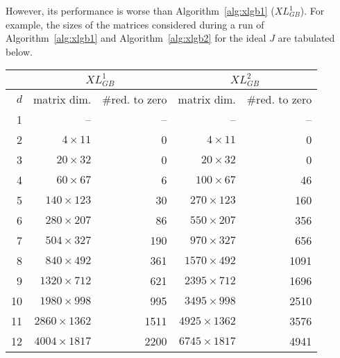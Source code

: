 \begin{algorithm}

\caption{$XL_{GB}^2$\label{alg:xlgb2}} 
\end{algorithm}

However, its performance is worse than Algorithm~\ref{alg:xlgb1} ($XL_{GB}^1$). For example, the sizes of the matrices considered during a run of Algorithm~\ref{alg:xlgb1} and Algorithm~\ref{alg:xlgb2} for the ideal $J$ are tabulated below.

\begin{center}
\begin{tabular}{|r|r|r|r|r|}
\hline
    & \multicolumn{2}{|c|}{$XL_{GB}^1$} & \multicolumn{2}{|c|}{$XL_{GB}^2$}\\
\hline
$d$ & matrix dim. & \#red. to zero & matrix dim. & \#red. to
zero\\
\hline
 1 &                 --&    --&                -- &    --\\
 2 & $   4 \times   11$&     0& $   4 \times   11$&     0\\
 3 & $  20 \times   32$&     0& $  20 \times   32$&     0\\
 4 & $  60 \times   67$&     6& $ 100 \times   67$&    46\\
 5 & $ 140 \times  123$&    30& $ 270 \times  123$&   160\\
 6 & $ 280 \times  207$&    86& $ 550 \times  207$&   356\\
 7 & $ 504 \times  327$&   190& $ 970 \times  327$&   656\\
 8 & $ 840 \times  492$&   361& $1570 \times  492$&  1091\\
 9 & $1320 \times  712$&   621& $2395 \times  712$&  1696\\
10 & $1980 \times  998$&   995& $3495 \times  998$&  2510\\
11 & $2860 \times 1362$&  1511& $4925 \times 1362$&  3576\\
12 & $4004 \times 1817$&  2200& $6745 \times 1817$&  4941\\
\hline
\end{tabular}
\end{center}

